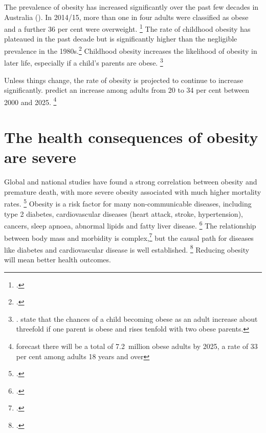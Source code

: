 \documentclass[embargoed]{grattan}
\begin{document}
The prevalence of obesity has increased significantly over the past few decades in Australia ().
In 2014/15, more than one in four adults were classified as obese and a further 36 per cent were overweight.%
\footcite[][Table 8.1]{ABS20154364055001NationalHealth} The rate of childhood obesity has plateaued in the past decade but is significantly higher than the negligible prevalence in the 1980s.\footcites{Hardy2010NSWSchoolsPhysical}{Booth2003obesity}
Childhood obesity increases the likelihood of obesity in later life, especially if a child's parents are obese.%
\footnote{\textcites{Health2013AustralianDietaryGuidelines}{Baker2007Childhoodbodymass}{Popkin2004nutritiontransitionworldwide}{Summerbell2005Interventionspreventingobesity}. \textcite{Sobko2011randomisedcontrolledtrial} state that the chances of a child becoming obese as an adult increase about threefold if one parent is obese and rises tenfold with two obese parents.}

Unless things change, the rate of obesity is projected to continue to increase significantly. \textcite{Walls2012Projectedprogressionprevalence} predict an increase among adults from 20 to 34 per cent between 2000 and 2025.%
\footnote{\textcite{PwC2015Weighingcostobesity} forecast there will be a total of 7.2~million obese adults by 2025, a rate of 33 per cent among adults 18 years and over}

\section{The health consequences of obesity are severe}\label{the-health-consequences-of-obesity-are-severe}

Global and national studies have found a strong correlation between obesity and premature death, with more severe obesity associated with much higher mortality rates.%
\footcites{Collaboration2016Bodymassindex}{Aune2016BMIallcause}{Flegal2013Associationallcause}{Korda2013Prospectivecohortstudy} Obesity is a risk factor for many non-communicable diseases, including type 2 diabetes, cardiovascular diseases (heart attack, stroke, hypertension), cancers, sleep apnoea, abnormal lipids and fatty liver disease.%
\footcites[][39--40]{Organisation2000Dietnutritionprevention}{Must1999diseaseburdenassociated}{Collaboration2016Bodymassindex}{Nordstroem2016RisksMyocardialInfarction} The relationship between body mass and morbidity is complex,\footcites{Swinburn2004Dietnutritionprevention}{Livingston2012Progressobesityresearch} but the causal path for diseases like diabetes and cardiovascular disease is well established.%
\footcites{Poirier2006Obesitycardiovasculardisease}{Kritchevsky2015Intentionalweightloss}{Rueda-Clausen2015Healthbenefitslong}{Blackburn1995Effectdegreeweight} Reducing obesity will mean better health outcomes.
\end{document}
